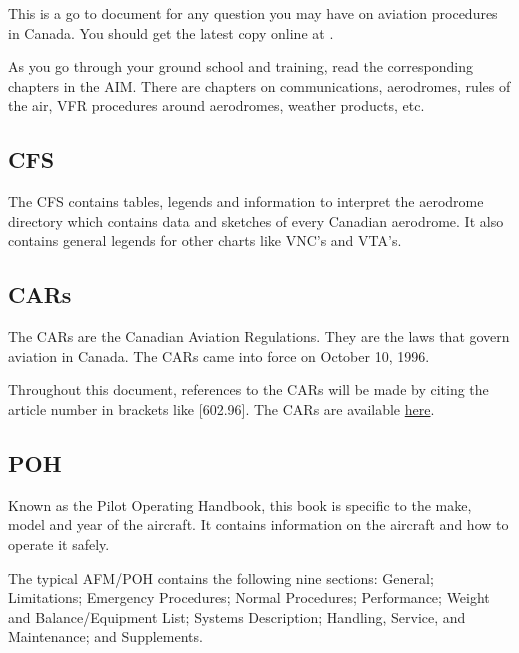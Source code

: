 \documentclass[12pt,letterpaper]{article}
\begin{document}
        This is a go to document for any question you may have on aviation procedures in Canada. You should get the latest copy online at \href{https://tc.canada.ca/en/aviation/publications/transport-canada-aeronautical-information-manual-tc-aim-tp-14371}{\color{cyan}{TP 14371}}.
        
        As you go through your ground school and training, read the corresponding chapters in the AIM. There are chapters on communications, aerodromes, rules of the air, VFR procedures around aerodromes, weather products, etc.

        \subsection{CFS}
        
        The CFS contains tables, legends and information to interpret the aerodrome directory which contains data and sketches of every Canadian aerodrome. It also contains general legends for other charts like VNC's and VTA's.

        \subsection{CARs}
        
        The CARs are the Canadian Aviation Regulations. They are the laws that govern aviation in Canada. The CARs came into force on October 10, 1996.
        
        Throughout this document, references to the CARs will be made by citing the article number in brackets like [602.96]. The CARs are available \href{https://tc.canada.ca/en/corporate-services/acts-regulations/list-regulations/canadian-aviation-regulations-sor-96-433}{\color{cyan}here}.
        
        \subsection{POH}
        
        Known as the Pilot Operating Handbook, this book is specific to the make, model and year of the aircraft. It contains information on the aircraft and how to operate it safely.
        
        The typical AFM/POH contains the following nine sections: General;
        Limitations; Emergency Procedures; Normal Procedures;
        Performance; Weight and Balance/Equipment List; Systems
        Description; Handling, Service, and Maintenance; and
        Supplements.
        
\end{document}
